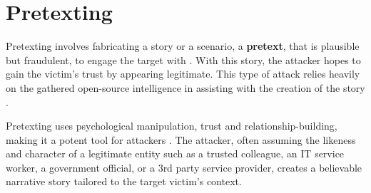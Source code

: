 \section{Pretexting}
\begin{comment}

    - General info about what is pretexting
    - Fabricated scenario that is plausible but fraudulent
    - Originally used by FBI
    - Impersonation
    - Discussion about how modern AI can aid with pretexting is in the final chapter
    - Role in the deception-based SE attacks
    - Common pretexting tactics will be covered later
    - How AI powers up pretexting will be discussed later
        - How AI tech can be utilized to create more sophisticated and convincing pretexts
        - Examples of successful pretexting attacks and their impacts
        - AI and automated pretexting attacks and their effectiveness
        - Analysis of pretexting evolving landscape with AI
    - Ethical considerations?
    - Countermeasures will be covered later also
        - How to identify and mitigate attempts
        - Recommendations for organiations to enhance their defenses against pretexting attacks
        
\end{comment}

Pretexting involves fabricating a story or a scenario, a \textbf{pretext}, that is plausible but fraudulent, to engage the target  with \citep{contehCybersecurityRisksVulnerabilities2016}. With this story, the attacker hopes to gain the victim's trust by appearing legitimate. This type of attack relies heavily on the gathered open-source intelligence in assisting with the creation of the story \citep{hadnagySocialEngineering2018}.

Pretexting uses psychological manipulation, trust and relationship-building, making it a potent tool for attackers \citep{mitnick_The_Art_of_Deception_2003}. The attacker, often assuming the likeness and character of a legitimate entity such as a trusted colleague, an IT service worker, a government official, or a 3rd party service provider, creates a believable narrative story tailored to the target victim's context.















